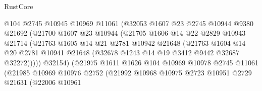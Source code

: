 \begin{lexlean}{RustCore}
\begin{coremodule}
                                @104
                                @2745
                                @10945
                                @10969
                                @11061
                                (@32053
                                  @1607
                                  @23
                                  @2745
                                  @10944
                                  @9380
                                  @21692
                                  (@21700
                                    @1607
                                    @23
                                    @10944
                                    (@21705
                                      @1606
                                      @14
                                      @22
                                      @2829
                                      @10943
                                      @21714
                                      (@21763
                                        @1605
                                        @14
                                        @21
                                        @2781
                                        @10942
                                        @21648
                                        (@21763
                                          @1604
                                          @14
                                          @20
                                          @2781
                                          @10941
                                          @21648
                                          (@32678 @1243 @14 @19 @3412 @9442 @32687 @32272)))))
                                  @32154)
                                (@21975
                                  @1611
                                  @1626
                                  @104
                                  @10969
                                  @10978
                                  @2745
                                  @11061
                                  (@21985
                                    @10969
                                    @10976
                                    @2752
                                    (@21992
                                      @10968
                                      @10975
                                      @2723
                                      @10951
                                      @2729
                                      @21631
                                      (@22006
                                        @10961

\end{coremodule}
\end{lexlean}
